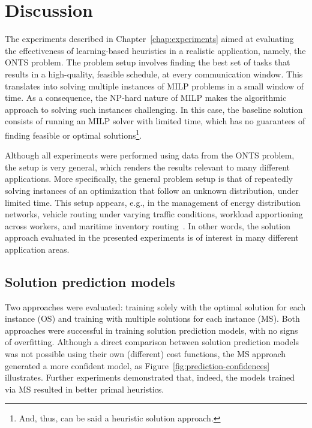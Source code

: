 

\chapter{Discussion}\label{chap:discussion}

The experiments described in Chapter~\ref{chap:experiments} aimed at evaluating the effectiveness of learning-based heuristics in a realistic application, namely, the ONTS problem.
The problem setup involves finding the best set of tasks that results in a high-quality, feasible schedule, at every communication window.
This translates into solving multiple instances of MILP problems in a small window of time.
As a consequence, the NP-hard nature of MILP makes the algorithmic approach to solving such instances challenging.
In this case, the baseline solution consists of running an MILP solver with limited time, which has no guarantees of finding feasible or optimal solutions\footnote{And, thus, can be said a heuristic solution approach.}.

Although all experiments were performed using data from the ONTS problem, the setup is very general, which renders the results relevant to many different applications.
More specifically, the general problem setup is that of repeatedly solving instances of an optimization that follow an unknown distribution, under limited time.
This setup appears, e.g., in the management of energy distribution networks, vehicle routing under varying traffic conditions, workload apportioning across workers, and maritime inventory routing~\cite{gasseMachineLearningCombinatorial2022,papageorgiouMIRPLibLibraryMaritime2014}.
In other words, the solution approach evaluated in the presented experiments is of interest in many different application areas.

\section{Solution prediction models}

Two approaches were evaluated: training solely with the optimal solution for each instance (OS) and training with multiple solutions for each instance (MS).
Both approaches were successful in training solution prediction models, with no signs of overfitting.
Although a direct comparison between solution prediction models was not possible using their own (different) cost functions, the MS approach generated a more confident model, as Figure~\ref{fig:prediction-confidences} illustrates.
Further experiments demonstrated that, indeed, the models trained via MS resulted in better primal heuristics.

